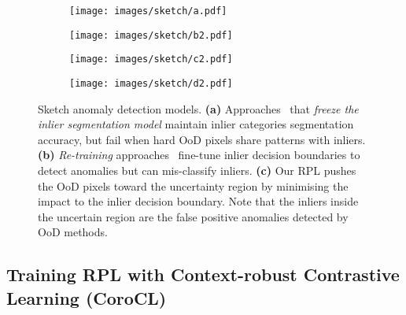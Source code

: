 \documentclass[10pt,twocolumn,letterpaper]{article}
\begin{document}
\begin{figure}[t!]
    \centering
    \begin{subfigure}[b]{0.23\textwidth}
         \centering
         \texttt{[image: images/sketch/a.pdf]}
         \caption*{}
     \end{subfigure} 
     \hfill
    \begin{subfigure}[b]{0.23\textwidth}
         \centering
         \texttt{[image: images/sketch/b2.pdf]}
         \caption{}
         \label{fig:freeze_sketch}
     \end{subfigure} 
     \hfill
    \centering
         \begin{subfigure}[b]{0.23\textwidth}
         \centering
         \texttt{[image: images/sketch/c2.pdf]}
         \caption{}
         \label{fig:re-train_sketch}
     \end{subfigure}
     \hfill
    \centering
         \begin{subfigure}[b]{0.23\textwidth}
         \centering
         \texttt{[image: images/sketch/d2.pdf]}
\caption{}
         \label{fig:ours_sketch}
     \end{subfigure}
     
    \vspace{-10 pt}
    \caption{Sketch anomaly detection models. \textbf{(a)} Approaches~\cite{jung2021standardized,di2021pixel} that \textit{freeze the inlier segmentation model} maintain inlier categories segmentation accuracy,
but fail when hard OoD pixels share patterns with inliers. \textbf{(b)} \textit{Re-training} approaches~\cite{tian2021pixel,chan2021entropy,grcic2022densehybrid} fine-tune inlier decision boundaries to detect anomalies but can mis-classify inliers. \textbf{(c)} Our RPL pushes the OoD pixels toward the uncertainty region by minimising the impact to the inlier decision boundary. Note that the inliers inside the uncertain region are the false positive anomalies detected by OoD methods.}
    \label{fig:sketch}
    \vspace{-10 pt}
\end{figure}

\subsection{Training RPL with Context-robust Contrastive Learning (CoroCL)}
\end{document}
